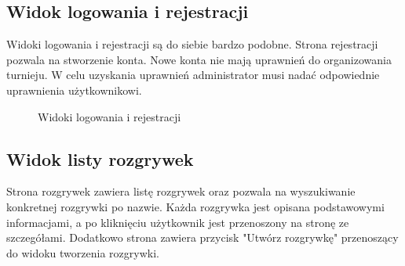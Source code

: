 \documentclass[shortabstract]{iithesis}
\begin{document}
\subsection{Widok logowania i rejestracji}
Widoki logowania i rejestracji są do siebie bardzo podobne.
Strona rejestracji pozwala na stworzenie konta. Nowe konta nie mają uprawnień do organizowania turnieju.
W celu uzyskania uprawnień administrator musi nadać odpowiednie uprawnienia użytkownikowi.
\begin{figure}[H]
    \centering
    \hfill
    \caption{Widoki logowania i rejestracji}
\end{figure}
\subsection{Widok listy rozgrywek}
Strona rozgrywek zawiera listę rozgrywek oraz pozwala na wyszukiwanie konkretnej rozgrywki po nazwie.
Każda rozgrywka jest opisana podstawowymi informacjami, a po kliknięciu użytkownik jest przenoszony na stronę ze szczegółami.
Dodatkowo strona zawiera przycisk "Utwórz rozgrywkę" przenoszący do widoku tworzenia rozgrywki.
\end{document}
